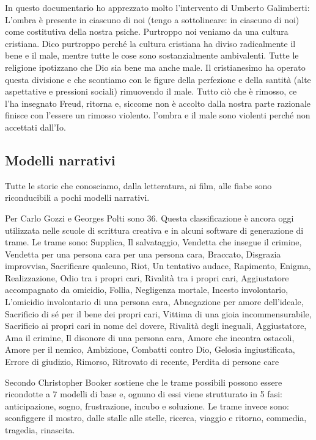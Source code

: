 \documentclass[12pt]{book} %
\begin{document}
In questo documentario ho apprezzato molto
l'intervento di Umberto Galimberti: L'ombra è presente in ciascuno di noi
(tengo a sottolineare: in ciascuno di noi) come costitutiva della nostra psiche. Purtroppo noi veniamo da una cultura
cristiana. Dico purtroppo perché la cultura cristiana ha diviso radicalmente il bene e il male, mentre tutte le cose
sono sostanzialmente ambivalenti. Tutte le religione ipotizzano che Dio sia bene ma anche male. Il cristianesimo ha
operato questa divisione e che scontiamo con le figure della perfezione e della santità (alte aspettative e pressioni
sociali) rimuovendo il male. Tutto ciò che è rimosso, ce l'ha insegnato Freud, ritorna e, siccome
non è accolto dalla nostra parte razionale finisce con l'essere un rimosso violento.
l'ombra e il male sono violenti perché non accettati dall'Io.

\subsection{Modelli narrativi}
Tutte le storie che conosciamo, dalla letteratura, ai film, alle fiabe sono riconducibili a pochi modelli narrativi. 

Per Carlo Gozzi e Georges Polti sono 36. Questa classificazione è ancora oggi utilizzata nelle scuole di scrittura
creativa e in alcuni software di generazione di trame. Le trame sono: Supplica, Il salvataggio, Vendetta che insegue il
crimine, Vendetta per una persona cara per una persona cara, Braccato, Disgrazia improvvisa, Sacrificare qualcuno,
Riot, Un tentativo audace, Rapimento, Enigma, Realizzazione, Odio tra i propri cari, Rivalità tra i propri cari,
Aggiustatore accompagnato da omicidio, Follia, Negligenza mortale, Incesto involontario, L'omicidio involontario di una
persona cara, Abnegazione per amore dell'ideale, Sacrificio di sé per il bene dei propri cari, Vittima di una gioia
incommensurabile, Sacrificio ai propri cari in nome del dovere, Rivalità degli ineguali, Aggiustatore, Ama il crimine,
Il disonore di una persona cara, Amore che incontra ostacoli, Amore per il nemico, Ambizione, Combatti contro Dio,
Gelosia ingiustificata, Errore di giudizio, Rimorso, Ritrovato di recente, Perdita di persone care 


\bigskip

Secondo Christopher Booker sostiene che le trame possibili possono essere ricondotte a 7 modelli di base e, ognuno di
essi viene strutturato in 5 fasi: anticipazione, sogno, frustrazione, incubo e soluzione. Le trame invece sono:
sconfiggere il mostro, dalle stalle alle stelle, ricerca, viaggio e ritorno, commedia, tragedia, rinascita.
\end{document}
